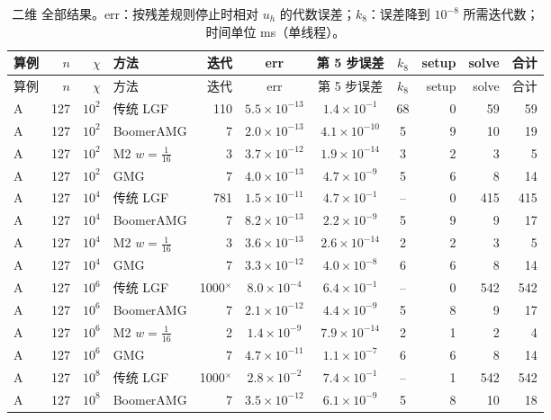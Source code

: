 \begingroup\footnotesize\setlength{\tabcolsep}{3pt}
\begin{longtable}{lrrlrcccrrr}
\caption{二维 全部结果。err：按残差规则停止时相对 $u_h$ 的代数误差；$k_8$：误差降到 $10^{-8}$ 所需迭代数；时间单位 ms（单线程）。}\\
\toprule 算例 & $n$ & $\chi$ & 方法 & 迭代 & err & 第 5 步误差 & $k_8$ & setup & solve & 合计 \\ \midrule
\endfirsthead \toprule 算例 & $n$ & $\chi$ & 方法 & 迭代 & err & 第 5 步误差 & $k_8$ & setup & solve & 合计 \\ \midrule \endhead
A & 127 & $10^{2}$ & 传统 LGF & 110 & $5.5{\times}10^{-13}$ & $1.4{\times}10^{-1}$ & 68 & 0 & 59 & 59 \\
A & 127 & $10^{2}$ & BoomerAMG & 7 & $2.0{\times}10^{-13}$ & $4.1{\times}10^{-10}$ & 5 & 9 & 10 & 19 \\
A & 127 & $10^{2}$ & M2 $w{=}\frac1{16}$ & 3 & $3.7{\times}10^{-12}$ & $1.9{\times}10^{-14}$ & 3 & 2 & 3 & 5 \\
A & 127 & $10^{2}$ & GMG & 7 & $4.0{\times}10^{-13}$ & $4.7{\times}10^{-9}$ & 5 & 6 & 8 & 14 \\
A & 127 & $10^{4}$ & 传统 LGF & 781 & $1.5{\times}10^{-11}$ & $4.7{\times}10^{-1}$ & -- & 0 & 415 & 415 \\
A & 127 & $10^{4}$ & BoomerAMG & 7 & $8.2{\times}10^{-13}$ & $2.2{\times}10^{-9}$ & 5 & 9 & 9 & 17 \\
A & 127 & $10^{4}$ & M2 $w{=}\frac1{16}$ & 3 & $3.6{\times}10^{-13}$ & $2.6{\times}10^{-14}$ & 2 & 2 & 3 & 5 \\
A & 127 & $10^{4}$ & GMG & 7 & $3.3{\times}10^{-12}$ & $4.0{\times}10^{-8}$ & 6 & 6 & 8 & 14 \\
A & 127 & $10^{6}$ & 传统 LGF & 1000$^\times$ & $8.0{\times}10^{-4}$ & $6.4{\times}10^{-1}$ & -- & 0 & 542 & 542 \\
A & 127 & $10^{6}$ & BoomerAMG & 7 & $2.1{\times}10^{-12}$ & $4.4{\times}10^{-9}$ & 5 & 8 & 9 & 17 \\
A & 127 & $10^{6}$ & M2 $w{=}\frac1{16}$ & 2 & $1.4{\times}10^{-9}$ & $7.9{\times}10^{-14}$ & 2 & 1 & 2 & 4 \\
A & 127 & $10^{6}$ & GMG & 7 & $4.7{\times}10^{-11}$ & $1.1{\times}10^{-7}$ & 6 & 6 & 8 & 14 \\
A & 127 & $10^{8}$ & 传统 LGF & 1000$^\times$ & $2.8{\times}10^{-2}$ & $7.4{\times}10^{-1}$ & -- & 1 & 542 & 542 \\
A & 127 & $10^{8}$ & BoomerAMG & 7 & $3.5{\times}10^{-12}$ & $6.1{\times}10^{-9}$ & 5 & 8 & 10 & 18 \\

\end{longtable}
